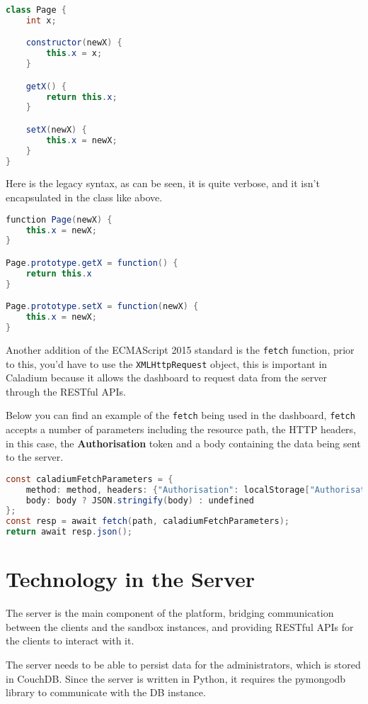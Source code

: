 \begin{lstlisting}[language=Java]
class Page {
    int x;

    constructor(newX) {
        this.x = x;
    }

    getX() {
        return this.x;
    }

    setX(newX) {
        this.x = newX;
    }
}
\end{lstlisting}

Here is the legacy syntax, as can be seen, it is quite verbose,
and it isn't encapsulated in the class like above.

\begin{lstlisting}[language=Java]
function Page(newX) {
    this.x = newX;
}

Page.prototype.getX = function() {
    return this.x
}

Page.prototype.setX = function(newX) {
    this.x = newX;
}
\end{lstlisting}

Another addition of the ECMAScript 2015 standard is the \texttt{fetch} function,
prior to this, you'd have to use the \texttt{XMLHttpRequest} object,
this is important in Caladium because it allows the dashboard to
request data from the server through the RESTful APIs.

Below you can find an example of the \texttt{fetch}
being used in the dashboard,
\texttt{fetch} accepts a number of parameters including the resource path,
the HTTP headers, in this case, the \textbf{Authorisation}
token and a body containing the data being sent to the server.

\begin{lstlisting}[language=Java]
const caladiumFetchParameters = {
    method: method, headers: {"Authorisation": localStorage["Authorisation"]},
    body: body ? JSON.stringify(body) : undefined
};
const resp = await fetch(path, caladiumFetchParameters);
return await resp.json();
\end{lstlisting}

\section{Technology in the Server}
The server is the main component of the platform,
bridging communication between the clients and the sandbox instances, 
and providing RESTful APIs for the clients to interact with it.

The server needs to be able to persist data for the administrators, 
which is stored in CouchDB. Since the server is written in Python,
it requires the pymongodb library to communicate with the DB instance.

